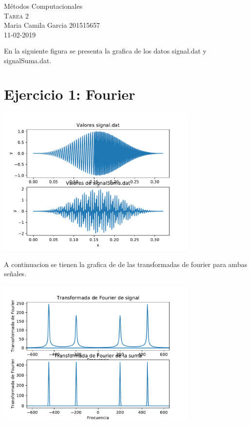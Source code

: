 \documentclass[11pt,letterpaper]{exam}
\begin{document}
\begin{center}
{\Large Métodos Computacionales} \\
\textsc{Tarea 2}\\
Maria Camila Garcia 201515657\\
11-02-2019\\
\end{center}

En la siguiente figura se presenta la grafica de los datos signal.dat y signalSuma.dat.

\noindent
\section{Ejercicio 1: Fourier}
\begin{center}
\includegraphics[width=10cm]{GarciaCamila_SubplotsGraficas.pdf}
\end{center}

A continuacion se tienen la grafica de de las transformadas de fourier para ambas señales. 

\begin{center}
\includegraphics[width=10cm]{GarciaCamila_Transformadas.pdf}
\end{center}
\end{document}
